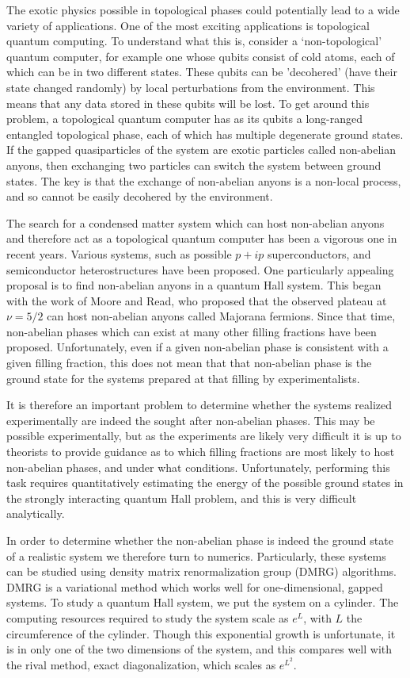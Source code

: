 The exotic physics possible in topological phases could potentially lead to a wide variety of applications. One of the most exciting applications is topological quantum computing. To understand what this is, consider a `non-topological' quantum computer, for example one whose qubits consist of cold atoms, each of which can be in two different states. These qubits can be 'decohered' (have their state changed randomly) by local perturbations from the environment. This means that any data stored in these qubits will be lost. To get around this problem, a topological quantum computer has as its qubits a long-ranged entangled topological phase, each of which has multiple degenerate ground states. If the gapped quasiparticles of the system are exotic particles called non-abelian anyons, then exchanging two particles can switch the system between ground states. The key is that the exchange of non-abelian anyons is a non-local process, and so cannot be easily decohered by the environment. 

The search for a condensed matter system which can host non-abelian anyons and therefore act as a topological quantum computer has been a vigorous one in recent years. Various systems, such as possible $p+ip$ superconductors, and semiconductor heterostructures have been proposed. One particularly appealing proposal is to find non-abelian anyons in a quantum Hall system. This began with the work of Moore and Read, who proposed that the observed plateau at $\nu=5/2$ can host non-abelian anyons called Majorana fermions. Since that time, non-abelian phases which can exist at many other filling fractions have been proposed\cite{ReadRezayi,BondersonSlingerland}. Unfortunately, even if a given non-abelian phase is consistent with a given filling fraction, this does not mean that that non-abelian phase is the ground state for the systems prepared at that filling by experimentalists. 

It is therefore an important problem to determine whether the systems realized experimentally are indeed the sought after non-abelian phases. This may be possible experimentally, but as the experiments are likely very difficult it is up to theorists to provide guidance as to which filling fractions are most likely to host non-abelian phases, and under what conditions. Unfortunately, performing this task requires quantitatively estimating the energy of the possible ground states in the strongly interacting quantum Hall problem, and this is very difficult analytically.

In order to determine whether the non-abelian phase is indeed the ground state of a realistic system we therefore turn to numerics. Particularly, these systems can be studied using density matrix renormalization group (DMRG) algorithms\cite{Zaletel}. DMRG is a variational method which works well for one-dimensional, gapped systems. To study a quantum Hall system, we put the system on a cylinder. The computing resources required to study the system scale as $e^L$, with $L$ the circumference of the cylinder. Though this exponential growth is unfortunate, it is in only one of the two dimensions of the system, and this compares well with the rival method, exact diagonalization, which scales as $e^{L^2}$. 

